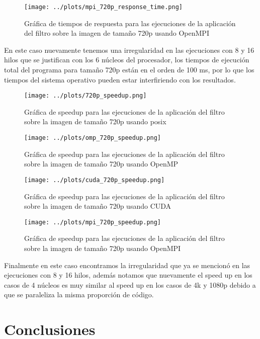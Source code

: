 \begin{figure}[H]
    \centering
    \texttt{[image: ../plots/mpi\_720p\_response\_time.png]}
    \caption{Gráfica de tiempos de respuesta para las ejecuciones de la aplicación del filtro sobre la imagen de tamaño 720p usando OpenMPI}
\end{figure}

En este caso nuevamente tenemos una irregularidad en las ejecuciones con 8 y 16 hilos que se justifican con los 6 núcleos del procesador, los tiempos de ejecución total del programa para tamaño 720p están en el orden de 100 ms, por lo que los tiempos del sistema operativo pueden estar interfiriendo con los resultados.

\begin{figure}[H]
    \centering
    \texttt{[image: ../plots/720p\_speedup.png]}
    \caption{Gráfica de speedup para las ejecuciones de la aplicación del filtro sobre la imagen de tamaño 720p usando posix}
\end{figure}

\begin{figure}[H]
    \centering
    \texttt{[image: ../plots/omp\_720p\_speedup.png]}
    \caption{Gráfica de speedup para las ejecuciones de la aplicación del filtro sobre la imagen de tamaño 720p usando OpenMP}
\end{figure}

\begin{figure}[H]
    \centering
    \texttt{[image: ../plots/cuda\_720p\_speedup.png]}
    \caption{Gráfica de speedup para las ejecuciones de la aplicación del filtro sobre la imagen de tamaño 720p usando CUDA}
\end{figure}

\begin{figure}[H]
    \centering
    \texttt{[image: ../plots/mpi\_720p\_speedup.png]}
    \caption{Gráfica de speedup para las ejecuciones de la aplicación del filtro sobre la imagen de tamaño 720p usando OpenMPI}
\end{figure}

Finalmente en este caso encontramos la irregularidad que ya se mencionó en las ejecuciones con 8 y 16 hilos, además notamos que nuevamente el speed up en los casos de 4 núcleos es muy similar al speed up en los casos de 4k y 1080p debido a que se paraleliza la misma proporción de código.

\section{Conclusiones}

